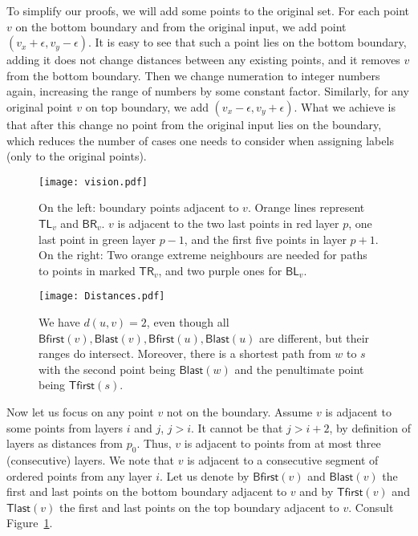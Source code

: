 \documentclass[a4paper,11pt]{article}
\newcommand{\eps}{\epsilon}
\newcommand{\BR}{\mathsf{BR}}
\newcommand{\BL}{\mathsf{BL}}
\newcommand{\TR}{\mathsf{TR}}
\newcommand{\TL}{\mathsf{TL}}
\newcommand{\Blast}{\mathsf{Blast}}
\newcommand{\Bfirst}{\mathsf{Bfirst}}
\newcommand{\Tlast}{\mathsf{Tlast}}
\newcommand{\Tfirst}{\mathsf{Tfirst}}
\begin{document}
To simplify our proofs, we will add some points to the original set.
For each point $v$ on the bottom boundary and from the original input, we add point $(v_x+\eps, v_y-\eps)$.
It is easy to see that such a point lies on the bottom boundary, adding it does not change distances between any
existing points, and it removes $v$ from the bottom boundary.
Then we change numeration to integer numbers again, increasing the range of numbers by some constant factor.
Similarly, for any original point $v$ on top boundary, we add $(v_x-\eps, v_y+\eps)$.
What we achieve is that after this change no point from the original input lies on the boundary,
which reduces the number of cases one needs to consider when assigning labels (only to the original points).

\begin{figure}[h]
\begin{center}
  \texttt{[image: vision.pdf]}
\end{center}
\caption{On the left: boundary points adjacent to $v$. Orange lines represent $\TL_v$ and $\BR_v$.
$v$ is adjacent to the two last points in red layer $p$, one last point in green layer $p-1$, and the first five points in layer $p+1$.
On the right: Two orange extreme neighbours are needed for paths to points in marked $\TR_v$, and two purple ones for $\BL_v$.}
\label{Fig:Vision}
\end{figure}

\begin{figure}[h]
\begin{center}
  \texttt{[image: Distances.pdf]}
\end{center}
\caption{We have $d(u,v)=2$, even though all $\Bfirst(v),\Blast(v),\Bfirst(u),\Blast(u)$ are different, but their ranges do intersect.
Moreover, there is a shortest path from $w$ to $s$ with the second point being $\Blast(w)$ and the penultimate point being $\Tfirst(s)$.}
\label{Fig:Dist}
\end{figure}

Now let us focus on any point $v$ not on the boundary.
Assume $v$ is adjacent to some points from layers $i$ and $j$, $j>i$.
It cannot be that $j>i+2$, by definition of layers as distances from $p_0$.
Thus, $v$ is adjacent to points from at most three (consecutive) layers.
We note that $v$ is adjacent to a consecutive segment of ordered points from any layer $i$.
Let us denote by $\Bfirst(v)$ and $\Blast(v)$ the first and last points on the bottom boundary adjacent to $v$
and by $\Tfirst(v)$ and $\Tlast(v)$ the first and last points on the top boundary adjacent to $v$.
Consult Figure~\ref{Fig:Vision}.
\end{document}
